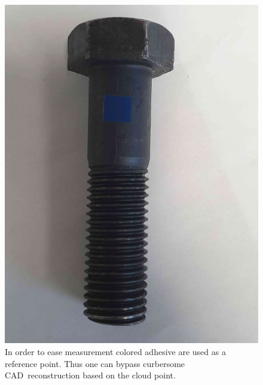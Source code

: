 \documentclass[11pt]{article}
\begin{document}
\begin{itemize}
\begin{figure}[htbp]
\centering
\includegraphics[width=.9\linewidth]{./vis_libellee.jpg}
\caption{\label{fig:adhesive}
In order to ease measurement colored adhesive are used as a reference point. Thus one can bypass curbersome CAD reconstruction based on the cloud point.}
\end{figure}
\end{itemize}
\end{document}
